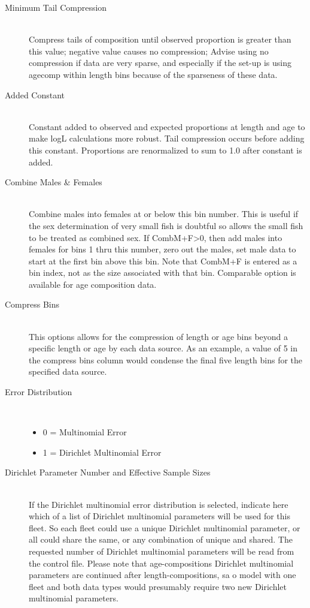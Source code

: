 \begin{description}
	\item[Minimum Tail Compression]\hfill\\
	Compress tails of composition until observed proportion is greater than this value; negative value causes no compression; Advise using no compression if data are very sparse, and especially if the set-up is using agecomp within length bins because of the sparseness of these data.

	\item[Added Constant]\hfill\\
	Constant added to observed and expected proportions at length and age to make logL calculations more robust.  Tail compression occurs before adding this constant.  Proportions are renormalized to sum to 1.0 after constant is added.

	\item[Combine Males \& Females]\hfill\\
	Combine males into females at or below this bin number.  This is useful if the sex determination of very small fish is doubtful so allows the small fish to be treated as combined sex.  If CombM+F>0, then add males into females for bins 1 thru this number, zero out the males, set male data to start at the first bin above this bin.  Note that CombM+F is entered as a bin index, not as the size associated with that bin.  Comparable option is available for age composition data.

	\item[Compress Bins]\hfill\\
	This options allows for the compression of length or age bins beyond a specific length or age by each data source.  As an example,  a value of 5 in the compress bins column would condense the final five length bins for the specified data source.
	\item[Error Distribution]\
	\begin{itemize}
		\item 0 = Multinomial Error
		\item 1 = Dirichlet Multinomial Error
	\end{itemize}

	\item[Dirichlet Parameter Number and Effective Sample Sizes]\hfill\\
	If the Dirichlet multinomial error distribution is selected, indicate here which of a list of Dirichlet multinomial parameters will be used for this fleet.  So each fleet could use a unique Dirichlet multinomial parameter, or all could share the same, or any combination of unique and shared.  The requested number of Dirichlet multinomial parameters will be read from the control file. Please note that age-compositions Dirichlet multinomial parameters are continued after length-compositions, sa o model with one fleet and both data types would presumably require two new Dirichlet multinomial parameters.  
	

\end{description}

